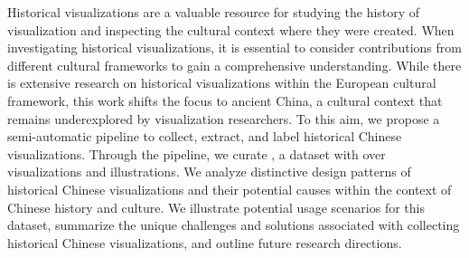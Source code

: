 Historical visualizations are a valuable resource for studying the history of visualization and inspecting the cultural context where they were created.
When investigating historical visualizations, it is essential to consider contributions from different cultural frameworks to gain a comprehensive understanding.
While there is extensive research on historical visualizations within the European cultural framework, this work shifts the focus to ancient China, a cultural context that remains underexplored by visualization researchers. 
To this aim, we propose a semi-automatic pipeline to collect, extract, and label historical Chinese visualizations.
Through the pipeline, we curate \datasetName, a dataset with over \numVisShort visualizations and \numIllusShort illustrations.
We analyze distinctive design patterns of historical Chinese visualizations and their potential causes within the context of Chinese history and culture.
We illustrate potential usage scenarios for this dataset, summarize the unique challenges and solutions associated with collecting historical Chinese visualizations, and outline future research directions.
